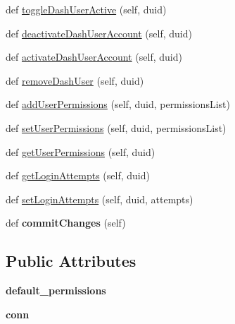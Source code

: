 \begin{DoxyCompactItemize}
\item 
def \hyperlink{classhandler_1_1dao_1_1user__dao_1_1_user_d_a_o_a7d3f0c6b17a15ea1bc3eb883d03ea0e8}{toggle\+Dash\+User\+Active} (self, duid)
\item 
def \hyperlink{classhandler_1_1dao_1_1user__dao_1_1_user_d_a_o_af9e5fda379f239935a78b40c95eee115}{deactivate\+Dash\+User\+Account} (self, duid)
\item 
def \hyperlink{classhandler_1_1dao_1_1user__dao_1_1_user_d_a_o_aa2dafcbc31416860bc4b64c2332c0f5c}{activate\+Dash\+User\+Account} (self, duid)
\item 
def \hyperlink{classhandler_1_1dao_1_1user__dao_1_1_user_d_a_o_a511ca5cdef0bc6e549c11e5f51dd831c}{remove\+Dash\+User} (self, duid)
\item 
def \hyperlink{classhandler_1_1dao_1_1user__dao_1_1_user_d_a_o_a33142b7d872005517261ea4e56b8e006}{add\+User\+Permissions} (self, duid, permissions\+List)
\item 
def \hyperlink{classhandler_1_1dao_1_1user__dao_1_1_user_d_a_o_a95abcb468f166ca40e8624e926c0f650}{set\+User\+Permissions} (self, duid, permissions\+List)
\item 
def \hyperlink{classhandler_1_1dao_1_1user__dao_1_1_user_d_a_o_a7a17e7bf435c7b67263577d6da96bb47}{get\+User\+Permissions} (self, duid)
\item 
def \hyperlink{classhandler_1_1dao_1_1user__dao_1_1_user_d_a_o_ac9b514fe18ddd0270ccba0bdbe053da4}{get\+Login\+Attempts} (self, duid)
\item 
def \hyperlink{classhandler_1_1dao_1_1user__dao_1_1_user_d_a_o_aec0187ac1e8c477a072a45b040edde2a}{set\+Login\+Attempts} (self, duid, attempts)
\item 
\mbox{\label{classhandler_1_1dao_1_1user__dao_1_1_user_d_a_o_a94c1e4101538b9c8a0e749eec63b8487}} 
def {\bfseries commit\+Changes} (self)
\end{DoxyCompactItemize}
\subsection*{Public Attributes}
\begin{DoxyCompactItemize}
\item 
\mbox{\label{classhandler_1_1dao_1_1user__dao_1_1_user_d_a_o_a62469aa1b879a3ea27dbb44506f98e2f}} 
{\bfseries default\+\_\+permissions}
\item 
\mbox{\label{classhandler_1_1dao_1_1user__dao_1_1_user_d_a_o_a428d3eaa0c903989ee9503f47ec26bc5}} 
{\bfseries conn}
\end{DoxyCompactItemize}


